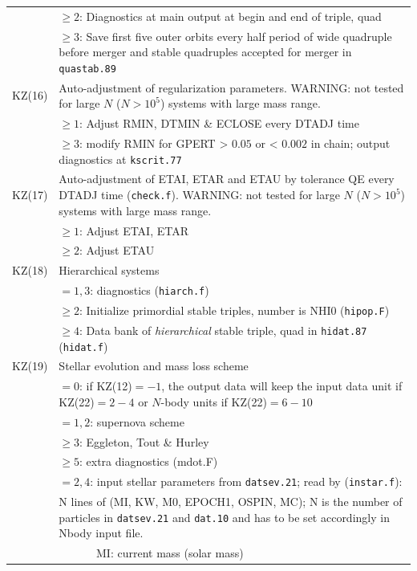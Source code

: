 \begin{longtable}{@{}p{1.5cm}p{13.0cm}}
        & $\ge 2$: Diagnostics at main output at begin and end of triple, quad \\
        & $\ge 3$: Save first five outer orbits every half period of wide quadruple before merger and stable quadruples accepted for merger in \texttt{quastab.89} \\
KZ(16)  & Auto-adjustment of regularization parameters. WARNING: not tested for large $N$ ($N>10^5$) systems with large mass range. \\
        & $\ge 1$: Adjust RMIN, DTMIN \& ECLOSE every DTADJ time \\
        & $\ge 3$: modify RMIN for GPERT > $0.05$ or < $0.002$ in chain; output diagnostics at \texttt{kscrit.77} \\
KZ(17)  & Auto-adjustment of ETAI, ETAR and ETAU by tolerance QE every DTADJ time (\texttt{check.f}). WARNING: not tested for large $N$ ($N>10^5$) systems with large mass range. \\
        & $\ge 1$: Adjust ETAI, ETAR \\
        & $\ge 2$: Adjust ETAU \\
KZ(18)  & Hierarchical systems \\
        & $=1,3$: diagnostics (\texttt{hiarch.f})\\
        & $\ge 2$: Initialize primordial stable triples, number is NHI0 (\texttt{hipop.F}) \\
        & $\ge 4$: Data bank of \textit{hierarchical} stable triple, quad in \texttt{hidat.87} (\texttt{hidat.f}) \\
KZ(19)  & Stellar evolution and mass loss scheme \\
        & $=0$: if KZ(12)$=-1$, the output data will keep the input data unit if KZ(22)$=2-4$ or $N$-body units if KZ(22)$=6-10$\\
        & $=1,2$: supernova scheme \\
        & $\ge 3$: Eggleton, Tout \& Hurley \\
        & $\ge 5$: extra diagnostics ({mdot.F}) \\
        & $=2,4$: input stellar parameters from \texttt{datsev.21}; 
                  read by (\texttt{instar.f}): \\
                & N lines of (MI, KW, M0, EPOCH1, OSPIN, MC); N is the number of particles in \texttt{datsev.21} and \texttt{dat.10} and has to be set accordingly in Nbody input file. \\
                & ~~~~~~   MI: current mass (solar mass) \\

\end{longtable}
